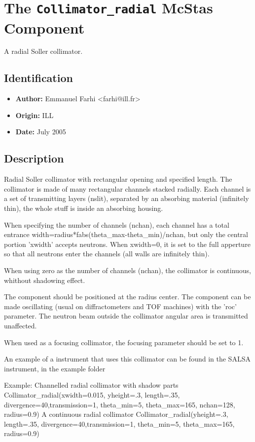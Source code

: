 \section{The \texttt{Collimator\_radial} McStas Component}
A radial Soller collimator.

\subsection*{Identification}
\begin{itemize}
  \item \textbf{Author:} Emmanuel Farhi \textless{}farhi@ill.fr\textgreater{}
  \item \textbf{Origin:} ILL
  \item \textbf{Date:} July 2005
\end{itemize}

\subsection*{Description}
Radial Soller collimator with rectangular opening and specified length. The collimator is made of many rectangular channels stacked radially. Each channel is a set of transmitting layers (nslit), separated by an absorbing material (infinitely thin), the whole stuff is inside an absorbing housing.

When specifying the number of channels (nchan), each channel has a total entrance width=radius*fabs(theta\_max-theta\_min)/nchan, but only the central portion 'xwidth' accepts neutrons. When xwidth=0, it is set to the full apperture so that all neutrons enter the channels (all walls are infinitely thin).

When using zero as the number of channels (nchan), the collimator is continuous, whithout shadowing effect.

The component should be positioned at the radius center. The component can be made oscillating (usual on diffractometers and TOF machines) with the 'roc' parameter. The neutron beam outside the collimator angular area is transmitted unaffected.

When used as a focusing collimator, the focusing parameter should be set to 1.

An example of a instrument that uses this collimator can be found in the SALSA instrument, in the example folder

Example: Channelled radial collimator with shadow parts Collimator\_radial(xwidth=0.015, yheight=.3, length=.35, divergence=40,transmission=1, theta\_min=5, theta\_max=165, nchan=128, radius=0.9) A continuous radial collimator Collimator\_radial(yheight=.3, length=.35, divergence=40,transmission=1, theta\_min=5, theta\_max=165, radius=0.9)

